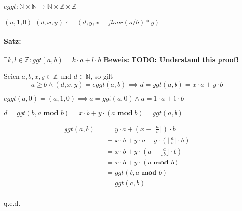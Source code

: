\documentclass[12pt]{scrreprt}
\newcommand{\theorem}[1]{\paragraph{Satz:} #1\newline}
\renewcommand{\mod}{\textbf{ mod }}
\newenvironment{proof}
    {\textbf{Beweis:}\newline\indent}
    {\begin{flushright}q.e.d.\end{flushright}}
\begin{document}
                    $ eggt : \mathbb{N} \times \mathbb{N} \rightarrow \mathbb{N} \times \mathbb{Z} \times \mathbb{Z} $

                    \begin{algorithmic}
                                \State \Return $ (a, 1, 0) $
                            \Else
                                \State $ (d, x, y) \gets $ \Call{eggt}{$ b $, $ a \mod b $}
                                \State \Return $ (d, y, x - floor(a / b) * y) $
                            \EndIf
                        \EndFunction
                    \end{algorithmic}

                    \theorem{$ \exists k, l \in \mathbb{Z} : ggt(a, b) = k \cdot a + l \cdot b $}
                        \begin{proof}
                            \textbf{TODO: Understand this proof!}

                            Seien $ a, b, x, y \in \mathbb{Z} $ und $ d \in \mathbb{N} $, so gilt
                            \[ a \geq b \land (d, x, y) = eggt(a, b) \implies d = ggt(a, b) = x \cdot a + y \cdot b \]

                            $ eggt(a, 0) = (a, 1, 0) \implies a = ggt(a, 0) \land a = 1 \cdot a + 0 \cdot b $

                            $ d = ggt(b, a \mod b) = x \cdot b + y \cdot (a \mod b) = ggt(a, b) $

                            \begin{eqnarray*}
                                     ggt(a, b)
                                && = y \cdot a + (x - \lfloor \frac{a}{b} \rfloor) \cdot b                  \\
                                && = x \cdot b + y \cdot a - y \cdot (\lfloor \frac{a}{b} \rfloor \cdot b)  \\
                                && = x \cdot b + y \cdot (a - \lfloor \frac{a}{b} \rfloor \cdot b)          \\
                                && = x \cdot b + y \cdot (a \mod b)                                         \\
                                && = ggt(b, a \mod b)                                                       \\
                                && = ggt(a, b)                                                              \\
                            \end{eqnarray*}
                        \end{proof}
\end{document}
